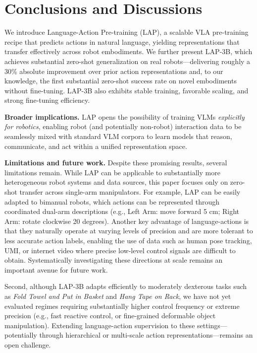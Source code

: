 \section{Conclusions and Discussions}
We introduce Language-Action Pre-training (LAP), a scalable VLA pre-training recipe that predicts actions in natural language, yielding representations that transfer effectively across robot embodiments. We further present \textsc{LAP-3B}, which achieves substantial zero-shot generalization on real robots—delivering roughly a 30\% absolute improvement over prior action representations and, to our knowledge, the first substantial zero-shot success rate on novel embodiments without fine-tuning. \textsc{LAP-3B} also exhibits stable training, favorable scaling, and strong fine-tuning efficiency.


\noindent\textbf{Broader implications.}
LAP opens the possibility of training VLMs \emph{explicitly for robotics}, enabling robot (and potentially non-robot) interaction data to be seamlessly mixed with standard VLM corpora to learn models that reason, communicate, and act within a unified representation space.

\noindent\textbf{Limitations and future work.}
Despite these promising results, several limitations remain. While LAP can be applicable to substantially more heterogeneous robot systems and data sources, this paper focuses only on zero-shot transfer across single-arm manipulators. For example, LAP can be easily adapted to bimanual robots, which actions can be represented through coordinated dual-arm descriptions (e.g., Left Arm: move forward 5 cm; Right Arm: rotate clockwise 20 degrees). Another key advantage of language-actions is that they naturally operate at varying levels of precision and are more
tolerant to less accurate action labels, enabling the use of data such as human pose tracking, UMI, or internet video where precise low-level control signals are difficult to obtain. Systematically investigating these directions at scale remains an important avenue for future work.

Second, although \textsc{LAP-3B} adapts efficiently to moderately dexterous tasks such as \emph{Fold Towel and Put in Basket} and \emph{Hang Tape on Rack}, we have not yet evaluated regimes requiring substantially higher control frequency or extreme precision (e.g., fast reactive control, or fine-grained deformable object manipulation). Extending language-action supervision to these settings—potentially through hierarchical or multi-scale action representations—remains an open challenge.